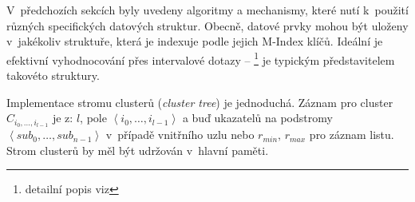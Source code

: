 V~předchozích sekcích byly uvedeny algoritmy a mechanismy, které
nutí k~použití různých specifických datových struktur\@. Obecně,
datové prvky mohou být uloženy v~jakékoliv struktuře, která je indexuje
podle jejich M-Index klíčů. Ideální je efektivní vyhodnocování přes
intervalové dotazy -- \BPTree{}\cite{Cormen:2001:IA:580470}%
\footnote{detailní popis \BPTree{} viz %
} je typickým představitelem takovéto struktury\@.

Implementace stromu clusterů (\emph{cluster tree}) je jednoduchá\@.
Záznam pro cluster $C_{i_{0},\ldots,i_{l-1}}$ je z: $l$, pole $\left\langle i_{0},\ldots,i_{l-1}\right\rangle $
a buď ukazatelů na podstromy $\left\langle sub_{0},\ldots,sub_{n-1}\right\rangle $
v~případě vnitřního uzlu nebo $r_{min},\, r_{max}$ pro záznam listu\@.
Strom clusterů by měl být udržován v~hlavní paměti.
